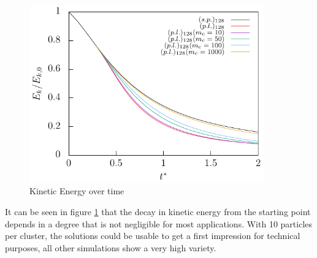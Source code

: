 \documentclass[a4paper,12pt]{article}
\numberwithin{equation}{section} %
\begin{document}
\begin{figure}[h]
	\centering
  \includegraphics[width=0.9\textwidth]{./../Simulationsergebnisse/variationWolken/128/kineticEnergy_time.pdf}
	\caption{Kinetic Energy over time}
	\label{kineticEnergy_time_128}
\end{figure}
It can be seen in figure \ref{kineticEnergy_time_128} that the decay in kinetic energy from the starting point depends in a degree that is not negligible for most applications. With 10 particles per cluster, the solutions could be usable to get a first impression for technical purposes, all other simulations show a very high variety. 
\newline
\end{document}
